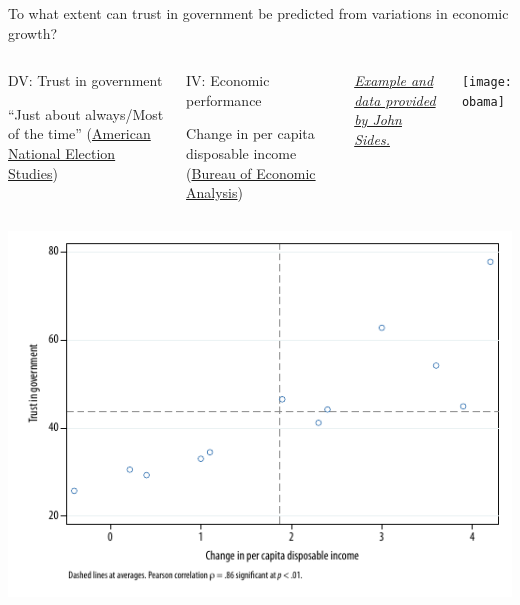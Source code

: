 \documentclass[t]{beamer}
\begin{document}
	
	\begin{frame}[c]{}
		
		\vfill

		To what extent can trust in government be predicted from variations in economic growth?
		
		\vfill
		 
		\begin{columns}[T]

		\begin{block}{DV: Trust in government}

			``Just about always/Most of the time'' (\href{http://www.electionstudies.org/}{American National Election Studies})

		\end{block}

		\begin{block}{IV: Economic performance}

			Change in per capita disposable income (\href{http://www.bea.gov/}{Bureau of Economic Analysis})

		\end{block}

		\vspace{1em}
		\footnotesize{%
			\textit{\href{http://www.themonkeycage.org/2010/02/what_will_make_people_love_gov.html}{Example and data provided by John Sides.}}%
		}


		\texttt{[image: obama]}
		\end{columns}
		
	\end{frame}
	
	

	\begin{frame}[c] %
			
		\begin{center}
			\includegraphics[width=\textwidth]{trust-correlation-0}
		\end{center}
				
	\end{frame}
\end{document}
